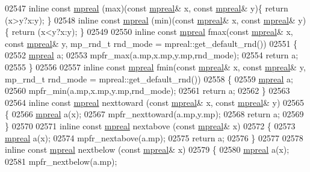 \begin{DoxyCode}
{{02547 \textcolor{keyword}{inline} \textcolor{keyword}{const} \hyperlink{classmpfr_1_1mpreal}{mpreal} (max)(\textcolor{keyword}{const} \hyperlink{classmpfr_1_1mpreal}{mpreal}& x, \textcolor{keyword}{const} \hyperlink{classmpfr_1_1mpreal}{mpreal}& y)\{    \textcolor{keywordflow}{return} (x>y?x:y);       \}
02548 \textcolor{keyword}{inline} \textcolor{keyword}{const} \hyperlink{classmpfr_1_1mpreal}{mpreal} (min)(\textcolor{keyword}{const} \hyperlink{classmpfr_1_1mpreal}{mpreal}& x, \textcolor{keyword}{const} \hyperlink{classmpfr_1_1mpreal}{mpreal}& y)\{    \textcolor{keywordflow}{return} (x<y?x:y);       \}
02549 
02550 \textcolor{keyword}{inline} \textcolor{keyword}{const} \hyperlink{classmpfr_1_1mpreal}{mpreal} fmax(\textcolor{keyword}{const} \hyperlink{classmpfr_1_1mpreal}{mpreal}& x, \textcolor{keyword}{const} \hyperlink{classmpfr_1_1mpreal}{mpreal}& y, mp\_rnd\_t rnd\_mode = 
      mpreal::get\_default\_rnd())
02551 \{
02552     \hyperlink{classmpfr_1_1mpreal}{mpreal} a;
02553     mpfr\_max(a.mp,x.mp,y.mp,rnd\_mode);
02554     \textcolor{keywordflow}{return} a;
02555 \}
02556 
02557 \textcolor{keyword}{inline} \textcolor{keyword}{const} \hyperlink{classmpfr_1_1mpreal}{mpreal} fmin(\textcolor{keyword}{const} \hyperlink{classmpfr_1_1mpreal}{mpreal}& x, \textcolor{keyword}{const} \hyperlink{classmpfr_1_1mpreal}{mpreal}& y,  mp\_rnd\_t rnd\_mode = 
      mpreal::get\_default\_rnd())
02558 \{
02559     \hyperlink{classmpfr_1_1mpreal}{mpreal} a;
02560     mpfr\_min(a.mp,x.mp,y.mp,rnd\_mode);
02561     \textcolor{keywordflow}{return} a;
02562 \}
02563 
02564 \textcolor{keyword}{inline} \textcolor{keyword}{const} \hyperlink{classmpfr_1_1mpreal}{mpreal} nexttoward (\textcolor{keyword}{const} \hyperlink{classmpfr_1_1mpreal}{mpreal}& x, \textcolor{keyword}{const} \hyperlink{classmpfr_1_1mpreal}{mpreal}& y)
02565 \{
02566     \hyperlink{classmpfr_1_1mpreal}{mpreal} a(x);
02567     mpfr\_nexttoward(a.mp,y.mp);
02568     \textcolor{keywordflow}{return} a;
02569 \}
02570 
02571 \textcolor{keyword}{inline} \textcolor{keyword}{const} \hyperlink{classmpfr_1_1mpreal}{mpreal} nextabove  (\textcolor{keyword}{const} \hyperlink{classmpfr_1_1mpreal}{mpreal}& x)
02572 \{
02573     \hyperlink{classmpfr_1_1mpreal}{mpreal} a(x);
02574     mpfr\_nextabove(a.mp);
02575     \textcolor{keywordflow}{return} a;
02576 \}
02577 
02578 \textcolor{keyword}{inline} \textcolor{keyword}{const} \hyperlink{classmpfr_1_1mpreal}{mpreal} nextbelow  (\textcolor{keyword}{const} \hyperlink{classmpfr_1_1mpreal}{mpreal}& x)
02579 \{
02580     \hyperlink{classmpfr_1_1mpreal}{mpreal} a(x);
02581     mpfr\_nextbelow(a.mp);
}}
\end{DoxyCode}
